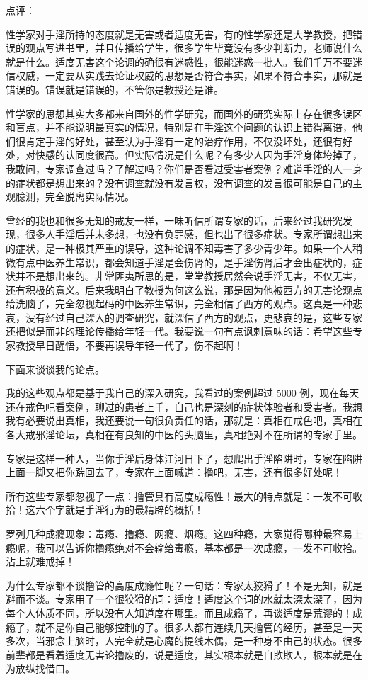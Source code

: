 \documentclass[fontset=founder]{ctexart}
\begin{document}
点评：

性学家对手淫所持的态度就是无害或者适度无害，有的性学家还是大学教授，把错误的观点写进书里，并且传播给学生，很多学生毕竟没有多少判断力，老师说什么就是什么。适度无害这个论调的确很有迷惑性，很能迷惑一批人。我们千万不要迷信权威，一定要从实践去论证权威的思想是否符合事实，如果不符合事实，那就是错误的。错误就是错误的，不管你是教授还是谁。

性学家的思想其实大多都来自国外的性学研究，而国外的研究实际上存在很多误区和盲点，并不能说明最真实的情况，特别是在手淫这个问题的认识上错得离谱，他们很肯定手淫的好处，甚至认为手淫有一定的治疗作用，不仅没坏处，还很有好处，对快感的认同度很高。但实际情况是什么呢？有多少人因为手淫身体垮掉了，我敢问，专家调查过吗？了解过吗？你们是否看过受害者案例？难道手淫的人一身的症状都是想出来的？没有调查就没有发言权，没有调查的发言很可能是自己的主观臆测，完全脱离实际情况。

曾经的我也和很多无知的戒友一样，一味听信所谓专家的话，后来经过我研究发现，很多人手淫后并未多想，也没有负罪感，但也出了很多症状。专家所谓想出来的症状，是一种极其严重的误导，这种论调不知毒害了多少青少年。如果一个人稍微有点中医养生常识，都会知道手淫是会伤肾的，是手淫伤肾后才会出症状的，症状并不是想出来的。非常匪夷所思的是，堂堂教授居然会说手淫无害，不仅无害，还有积极的意义。后来我明白了教授为何这么说，那是因为他被西方的无害论观点给洗脑了，完全忽视起码的中医养生常识，完全相信了西方的观点。这真是一种悲哀，没有经过自己深入的调查研究，就深信了西方的观点，更悲哀的是，这些专家还把似是而非的理论传播给年轻一代。我要说一句有点讽刺意味的话：希望这些专家教授早日醒悟，不要再误导年轻一代了，伤不起啊！

下面来谈谈我的论点。

我的这些观点都是基于我自己的深入研究，我看过的案例超过 5000 例，现在每天还在戒色吧看案例，聊过的患者上千，自己也是深刻的症状体验者和受害者。我想我有必要说出真相，我还要说一句很负责任的话，那就是：真相在戒色吧，真相在各大戒邪淫论坛，真相在有良知的中医的头脑里，真相绝对不在所谓的专家手里。

专家是这样一种人，当你手淫后身体江河日下了，想爬出手淫陷阱时，专家在陷阱上面一脚又把你踹回去了，专家在上面喊道：撸吧，无害，还有很多好处呢！

所有这些专家都忽视了一点：撸管具有高度成瘾性！最大的特点就是：一发不可收拾！这六个字就是手淫行为的最精辟的概括！

罗列几种成瘾现象：毒瘾、撸瘾、网瘾、烟瘾。这四种瘾，大家觉得哪种最容易上瘾呢，我可以告诉你撸瘾绝对不会输给毒瘾，基本都是一次成瘾，一发不可收拾。沾上就难戒掉！

为什么专家都不谈撸管的高度成瘾性呢？一句话：专家太狡猾了！不是无知，就是避而不谈。专家用了一个很狡猾的词：适度！适度这个词的水就太深太深了，因为每个人体质不同，所以没有人知道度在哪里。而且成瘾了，再谈适度是荒谬的！成瘾了，就不是你自己能够控制的了。很多人都有连续几天撸管的经历，甚至是一天多次，当邪念上脑时，人完全就是心魔的提线木偶，是一种身不由己的状态。很多前辈都是看着适度无害论撸废的，说是适度，其实根本就是自欺欺人，根本就是在为放纵找借口。
\end{document}
